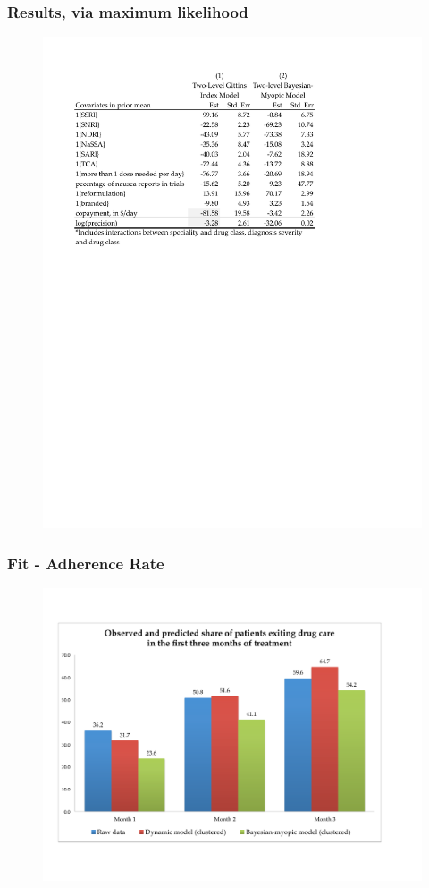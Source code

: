 \documentclass[xcolor=pdftex,dvipsnames,table,mathserif,aspectratio=169]{beamer}
\begin{document}
\begin{frame}
\frametitle{Results, via maximum likelihood}

\begin{figure}[h!]
\centering\includegraphics[width=0.8\linewidth]{./resources/est_table.pdf}
\end{figure}

\hyperlink{ESTIMATION}{}
\end{frame}


\begin{frame}
\frametitle{Fit - Adherence Rate}

\begin{figure}[h!]
\centering\includegraphics[width=1\linewidth]{./resources/fit_adherence_chart.pdf}
\end{figure}
\end{frame}
\end{document}
